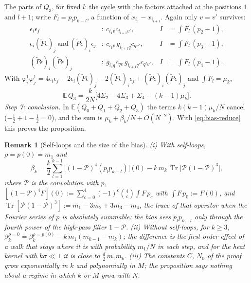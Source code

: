 \documentclass[11pt,a4paper]{article}
\makeatletter
\theoremstyle{stmt}
\theoremstyle{defn}
\theoremstyle{rmk}
\newtheorem{remark}[theorem]{Remark}
\renewenvironment{proof}[1][\proofname]{\par\pushQED{\qed}\normalfont\topsep6\p@\@plus6\p@\relax
  \trivlist\item[\hskip\labelsep{\sffamily\itshape\small #1.}]\ignorespaces}{\popQED\endtrivlist\@endpefalse}
\numberwithin{equation}{section}
\DeclareMathOperator{\Tr}{Tr}
\makeatother
\begin{document}
{\begin{proof}
\noindent The parts of $Q_3$, for fixed $l$: the cycle with the factors attached at the positions $1$ and $l+1$; write $F_l=p_lp_{k-l}$, a function of $x_{i_1}-x_{i_{l+1}}$. Again only $v=v'$ survives:
\begin{align*}
\epsilon_i\epsilon_j&:\ c_{i_1v}c_{i_{l+1}v'},&I&=\textstyle\int F_l\,(p_2-1),\\
\epsilon_i(\tilde P\epsilon)_j\ \text{and}\ (\tilde P\epsilon)_i\epsilon_j&:\ c_{i_1v}\,g_{i_{l+1}q}c_{qv'},&I&=\textstyle\int F_l\,(p_3-1),\\
(\tilde P\epsilon)_i(\tilde P\epsilon)_j&:\ g_{i_1q}c_{qv}\,g_{i_{l+1}q'}c_{q'v'},&I&=\textstyle\int F_l\,(p_4-1).
\end{align*}
With $\varphi^1_i\varphi^1_j=4\epsilon_i\epsilon_j-2\epsilon_i(\tilde P\epsilon)_j-2(\tilde P\epsilon)_i\epsilon_j+(\tilde P\epsilon)_i(\tilde P\epsilon)_j$ and $\int F_l=\mu_k$,
\[
\mathbb E\,Q_3=\frac k{2N}\Big[4\Sigma_2-4\Sigma_3+\Sigma_4-(k-1)\mu_k\Big].
\]
\emph{Step 7: conclusion.} In $\mathbb E(Q_0+Q_1+Q_2+Q_3)$ the terms $k(k-1)\mu_k/N$ cancel ($-\frac12+1-\frac12=0$), and the sum is $\mu_k+\beta_k/N+O(N^{-2})$. With \eqref{eq:bias-reduce} this proves the proposition.
\end{proof}

\begin{remark}[Self-loops and the size of the bias]\label{rem:bias}
(i) With self-loops, $\rho=p(0)=m_1$ and
\[
\beta_k=\frac k2\sum_{l=1}^{k-1}\big[(1-\mathcal P)^4(p_lp_{k-l})\big](0)-k\,m_k\,\Tr\big[\mathcal P(1-\mathcal P)^3\big],
\]
where $\mathcal P$ is the convolution with $p$, $[(1-\mathcal P)^4F](0):=\sum_{c=0}^4(-1)^c\binom4c\int F\,p_c$ with $\int F\,p_0:=F(0)$, and $\Tr[\mathcal P(1-\mathcal P)^3]:=m_1-3m_2+3m_3-m_4$, the trace of that operator when the Fourier series of $p$ is absolutely summable: the bias sees $p_lp_{k-l}$ only through the fourth power of the high-pass filter $1-\mathcal P$. (ii) Without self-loops, for $k\ge3$, $\beta_k^{\rho=0}=\beta_k^{\rho=p(0)}-k\,m_1(m_{k-1}-m_k)$; the difference is the first-order effect of a walk that stays where it is with probability $m_1/N$ in each step, and for the heat kernel with $k\sigma\ll1$ it is close to $\tfrac d2\,m_1m_k$. (iii) The constants $C$, $N_0$ of the proof grow exponentially in $k$ and polynomially in $M$; the proposition says nothing about a regime in which $k$ or $M$ grow with $N$.


\end{remark}}
\end{document}
